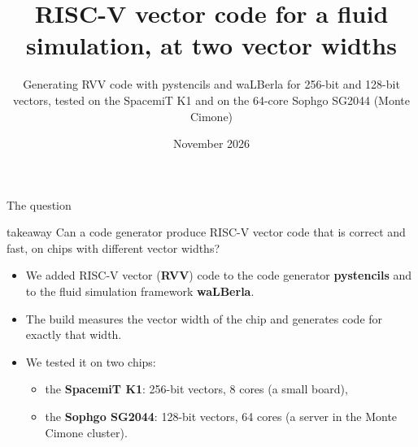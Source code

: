 \documentclass[aspectratio=169,10pt,t]{beamer}
\title{RISC-V vector code for a fluid simulation, at two vector widths}
\subtitle{Generating RVV code with pystencils and waLBerla for 256-bit and 128-bit vectors,
  tested on the SpacemiT K1 and on the 64-core Sophgo SG2044 (Monte Cimone)}
\author{\presenter}
\date{November 2026}
\newcommand{\term}[1]{\textcolor{psblue!85!black}{\textbf{#1}}} %
\begin{document}
\begin{frame}[plain]
\end{frame}

\begin{frame}{The question}
  \vspace{6mm}
  \begin{beamercolorbox}[wd=\textwidth,sep=6pt,rounded=true]{takeaway}
    \large Can a code generator produce RISC-V vector code that is correct and fast,
    on chips with different vector widths?
  \end{beamercolorbox}
  \vspace{6mm}
  \begin{itemize}
    \item We added RISC-V vector (\term{RVV}) code to the code generator \term{pystencils} and to the fluid
          simulation framework \term{waLBerla}.
    \item The build measures the vector width of the chip and generates code for exactly that width.
    \item We tested it on two chips:
      \begin{itemize}
        \item the \term{SpacemiT K1}: 256-bit vectors, 8 cores (a small board),
        \item the \term{Sophgo SG2044}: 128-bit vectors, 64 cores (a server in the Monte Cimone cluster).
      \end{itemize}
  \end{itemize}
\end{frame}
\end{document}
